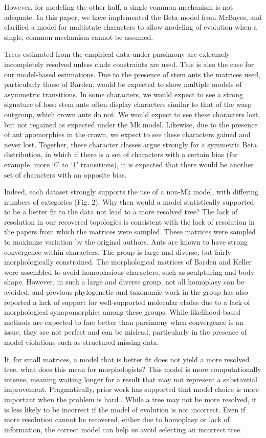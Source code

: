 \documentclass[]{article}
\begin{document}
However, for modeling the other half, a single common mechanism is not adequate. 
In this paper, we have implemented the Beta model from MrBayes, and clarified a model for multistate characters to allow modeling of evolution when a single, common mechanism cannot be assumed. \par
Trees estimated from the empirical data under parsimony are extremely incompletely resolved unless clade constraints are used.
This is also the case for our model-based estimations. 
Due to the presence of stem ants the matrices used, particularly those of Barden, would be expected to show multiple models of asymmetric transitions. 
In some characters, we would expect to see a strong signature of loss: stem ants often display characters similar to that of the wasp outgroup, which crown ants do not.
We would expect to see these characters lost, but not regained as expected under the Mk model.
Likewise, due to the presence of ant apomorphies in the crown, we expect to see these characters gained and never lost.
Together, these character classes argue strongly for a symmetric Beta distribution, in which if there is a set of characters with a certain bias (for example, more `0' to `1' transitions), it is expected that there would be another set of characters with an opposite bias. \par
Indeed, each dataset strongly supports the use of a non-Mk model, with differing numbers of categories (Fig. 2).
Why then would a model statistically supported to be a better fit to the data not lead to a more resolved tree?
The lack of resolution in our recovered topologies is consistent with the lack of resolution in the papers from which the matrices were sampled.
These matrices were sampled to maximize variation by the original authors. 
Ants are known to have strong convergence within characters.
The group is large and diverse, but fairly morphologically constrained.
The morphological matrices of Barden and Keller were assembled to avoid homoplasious characters, such as sculpturing and body shape. 
However, in such a large and diverse group, not all homoplasy can be avoided, and previous phylogenetic and taxonomic work in the group has also reported a lack of support for well-supported molecular clades due to a lack of morphological synapomorphies among these groups. 
While likelihood-based methods are expected to fare better than parsimony when convergence is an issue, they are not perfect and can be mislead, particularly in the presence of model violations such as structured missing data.
\par
If, for small matrices, a model that is better fit does not yield a more resolved tree, what does this mean for morphologists? 
This model is more computationally intense, meaning waiting longer for a result that may not represent a substantial improvement.
Pragmatically, prior work has supported that model choice is more important when the problem is hard \citep{wright2014, Wright2016}. 
While a tree may not be more resolved, it is less likely to be incorrect if the model of evolution is not incorrect.
Even if more resolution cannot be recovered, either due to homoplasy or lack of information, the correct model can help us avoid selecting an incorrect tree.
 \par
\end{document}
